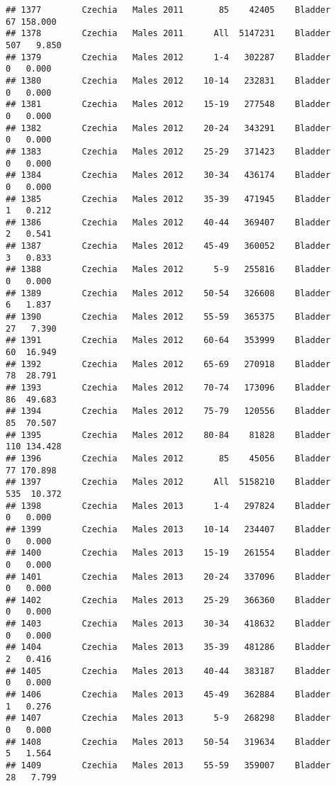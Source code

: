 \documentclass[
]{article}
\begin{document}
\begin{verbatim}
## 1377        Czechia   Males 2011       85    42405    Bladder     67 158.000
## 1378        Czechia   Males 2011      All  5147231    Bladder    507   9.850
## 1379        Czechia   Males 2012      1-4   302287    Bladder      0   0.000
## 1380        Czechia   Males 2012    10-14   232831    Bladder      0   0.000
## 1381        Czechia   Males 2012    15-19   277548    Bladder      0   0.000
## 1382        Czechia   Males 2012    20-24   343291    Bladder      0   0.000
## 1383        Czechia   Males 2012    25-29   371423    Bladder      0   0.000
## 1384        Czechia   Males 2012    30-34   436174    Bladder      0   0.000
## 1385        Czechia   Males 2012    35-39   471945    Bladder      1   0.212
## 1386        Czechia   Males 2012    40-44   369407    Bladder      2   0.541
## 1387        Czechia   Males 2012    45-49   360052    Bladder      3   0.833
## 1388        Czechia   Males 2012      5-9   255816    Bladder      0   0.000
## 1389        Czechia   Males 2012    50-54   326608    Bladder      6   1.837
## 1390        Czechia   Males 2012    55-59   365375    Bladder     27   7.390
## 1391        Czechia   Males 2012    60-64   353999    Bladder     60  16.949
## 1392        Czechia   Males 2012    65-69   270918    Bladder     78  28.791
## 1393        Czechia   Males 2012    70-74   173096    Bladder     86  49.683
## 1394        Czechia   Males 2012    75-79   120556    Bladder     85  70.507
## 1395        Czechia   Males 2012    80-84    81828    Bladder    110 134.428
## 1396        Czechia   Males 2012       85    45056    Bladder     77 170.898
## 1397        Czechia   Males 2012      All  5158210    Bladder    535  10.372
## 1398        Czechia   Males 2013      1-4   297824    Bladder      0   0.000
## 1399        Czechia   Males 2013    10-14   234407    Bladder      0   0.000
## 1400        Czechia   Males 2013    15-19   261554    Bladder      0   0.000
## 1401        Czechia   Males 2013    20-24   337096    Bladder      0   0.000
## 1402        Czechia   Males 2013    25-29   366360    Bladder      0   0.000
## 1403        Czechia   Males 2013    30-34   418632    Bladder      0   0.000
## 1404        Czechia   Males 2013    35-39   481286    Bladder      2   0.416
## 1405        Czechia   Males 2013    40-44   383187    Bladder      0   0.000
## 1406        Czechia   Males 2013    45-49   362884    Bladder      1   0.276
## 1407        Czechia   Males 2013      5-9   268298    Bladder      0   0.000
## 1408        Czechia   Males 2013    50-54   319634    Bladder      5   1.564
## 1409        Czechia   Males 2013    55-59   359007    Bladder     28   7.799

\end{verbatim}
\end{document}
